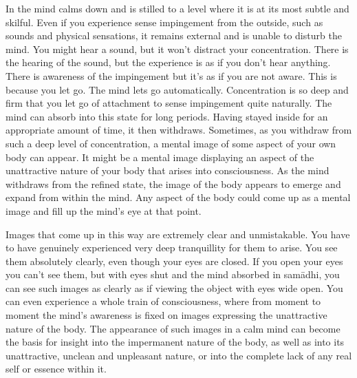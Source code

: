 In  the mind calms down and is stilled to a level where it is at its most subtle and skilful. Even if you experience sense impingement from the outside, such as sounds and physical sensations, it remains external and is unable to disturb the mind. You might hear a sound, but it won't distract your concentration. There is the hearing of the sound, but the experience is as if you don't hear anything. There is awareness of the impingement but it's as if you are not aware. This is because you let go. The mind lets go automatically. Concentration is so deep and firm that you let go of attachment to sense impingement quite naturally. The mind can absorb into this state for long periods. Having stayed inside for an appropriate amount of time, it then withdraws. Sometimes, as you withdraw from such a deep level of concentration, a mental image of some aspect of your own body can appear. It might be a mental image displaying an aspect of the unattractive nature of your body that arises into consciousness. As the mind withdraws from the refined state, the image of the body appears to emerge and expand from within the mind. Any aspect of the body could come up as a mental image and fill up the mind's eye at that point. 

Images that come up in this way are extremely clear and unmistakable. You have to have genuinely experienced very deep tranquillity for them to arise. You see them absolutely clearly, even though your eyes are closed. If you open your eyes you can't see them, but with eyes shut and the mind absorbed in sam\=adhi, you can see such images as clearly as if viewing the object with eyes wide open. You can even experience a whole train of consciousness, where from moment to moment the mind's awareness is fixed on images expressing the unattractive nature of the body. The appearance of such images in a calm mind can become the basis for insight into the impermanent nature of the body, as well as into its unattractive, unclean and unpleasant nature, or into the complete lack of any real self or essence within it.

